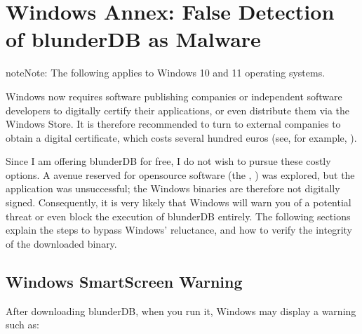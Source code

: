 \documentclass[letterpaper,10pt,english]{sphinxmanual}
\begin{document}
\section{Windows Annex: False Detection of blunderDB as Malware}
\label{\detokenize{annexe_windows_securite:annexe-windows-detection-abusive-de-blunderdb-comme-logiciel-malveillant}}\label{\detokenize{annexe_windows_securite:annexe-windows-malware}}\label{\detokenize{annexe_windows_securite::doc}}
\begin{sphinxadmonition}{note}{Note:}
\sphinxAtStartPar
The following applies to Windows 10 and 11 operating systems.
\end{sphinxadmonition}

\sphinxAtStartPar
Windows now requires software publishing companies or independent software developers to digitally certify their applications, or even distribute them via the Windows Store. It is therefore recommended to turn to external companies to obtain a digital certificate, which costs several hundred euros (see, for example, ).

\sphinxAtStartPar
Since I am offering blunderDB for free, I do not wish to pursue these costly options. A  avenue reserved for open\sphinxhyphen{}source software (the , ) was explored, but the application was unsuccessful; the Windows binaries are therefore not digitally signed. Consequently, it is very likely that Windows will warn you of a potential threat or even block the execution of blunderDB entirely. The following sections explain the steps to bypass Windows’ reluctance, and how to verify the integrity of the downloaded binary.


\subsection{Windows SmartScreen Warning}
\label{\detokenize{annexe_windows_securite:avertissement-windows-smartscreen}}
\sphinxAtStartPar
After downloading blunderDB, when you run it, Windows may display a warning such as:

\begin{figure}[htbp]
\centering

\noindent{}
\end{figure}
\end{document}
